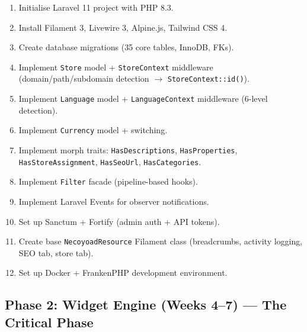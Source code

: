 \documentclass[11pt,a4paper]{article}
\begin{document}
\begin{enumerate}[leftmargin=1.6em,itemsep=2pt]
  \item Initialise Laravel 11 project with PHP 8.3.
  \item Install Filament 3, Livewire 3, Alpine.js, Tailwind CSS 4.
  \item Create database migrations (35 core tables, InnoDB, FKs).
  \item Implement \texttt{Store} model + \texttt{StoreContext} middleware
        (domain/path/subdomain detection $\to$ \texttt{StoreContext::id()}).
  \item Implement \texttt{Language} model + \texttt{LanguageContext}
        middleware (6-level detection).
  \item Implement \texttt{Currency} model + switching.
  \item Implement morph traits: \texttt{HasDescriptions},
        \texttt{HasProperties}, \texttt{HasStoreAssignment},
        \texttt{HasSeoUrl}, \texttt{HasCategories}.
  \item Implement \texttt{Filter} facade (pipeline-based hooks).
  \item Implement Laravel Events for observer notifications.
  \item Set up Sanctum + Fortify (admin auth + API tokens).
  \item Create base \texttt{NecoyoadResource} Filament class (breadcrumbs,
        activity logging, SEO tab, store tab).
  \item Set up Docker + FrankenPHP development environment.
\end{enumerate}

\subsection{Phase 2: Widget Engine (Weeks 4--7) --- The Critical Phase}
\end{document}
